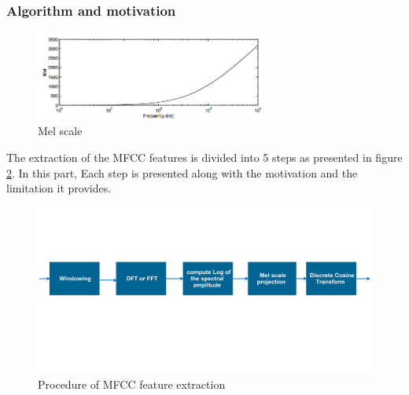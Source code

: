 \documentclass[hidelinks,12pt]{report}
\begin{document}
\subsubsection{Algorithm and motivation}
\begin{figure}[t!]
  
  \centering
	    \includegraphics[width=0.7\textwidth]{melscale}
    \caption{Mel scale }
    \label{mel}
\end{figure}
The extraction of the MFCC features is divided into 5 steps as presented in figure \ref{mfcc}. In this part, Each step is presented along with the motivation and the limitation it provides.
\begin{figure}[t!]
  
  \centering
	    \includegraphics[width=1\textwidth]{MFCC2}
    \caption{Procedure of MFCC feature extraction }
    \label{mfcc}
\end{figure}
\end{document}
